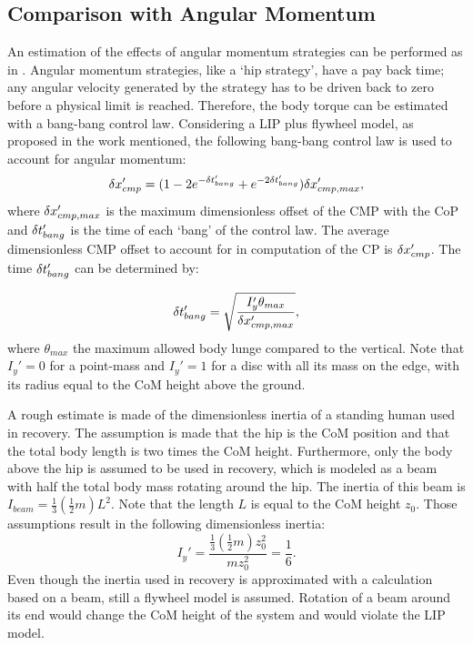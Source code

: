 \subsection{Comparison with Angular Momentum}
An estimation of the effects of angular momentum strategies can be performed as in \cite{koolen2012capturability}. Angular momentum strategies, like a `hip strategy', have a pay back time; any angular velocity generated by the strategy has to be driven back to zero before a physical limit is reached. Therefore, the body torque can be estimated with a bang-bang control law.  Considering a \ac{LIP} plus flywheel model, as proposed in the work mentioned, the following bang-bang control law is used to account for angular momentum:
\begin{equation}
\delta x_{cmp}' = (1-2e^{-\delta t_{bang}'}+e^{-2\delta t_{bang}'})\delta x_{cmp,max}',
\end{equation}
where $\delta x_{cmp,max}'$ is the maximum dimensionless offset of the \ac{CMP} with the \ac{CoP} and $\delta t_{bang}'$ is the time of each `bang' of the control law. The average dimensionless \ac{CMP} offset to account for in computation of the \ac{CP} is $\delta x_{cmp}'$. The time $\delta t_{bang}'$ can be determined by:

\begin{equation}
\delta t_{bang}' = \sqrt{\frac{I_y'\theta_{max}}{\delta x_{cmp,max}'}},
\end{equation}
where $\theta_{max}$ the maximum allowed body lunge compared to the vertical. Note that $I_y'=0$ for a point-mass and $I_y'=1$ for a disc with all its mass on the edge, with its radius equal to the \ac{CoM} height above the ground. 

A rough estimate is made of the dimensionless inertia of a standing human used in recovery. The assumption is made that the hip is the \ac{CoM} position \cite{gard2004comparison} and that the total body length is two times the \ac{CoM} height. Furthermore, only the body above the hip is assumed to be used in recovery, which is modeled as a beam with half the total body mass rotating around the hip. The inertia of this beam is $I_{beam} = \frac{1}{3}(\frac{1}{2}m)L^2$. Note that the length $L$ is equal to the \ac{CoM} height $z_0$. Those assumptions result in the following dimensionless inertia:
\begin{equation}
	I_y' = \frac{\frac{1}{3}(\frac{1}{2}m)z_0^2}{mz_0^2} = \frac{1}{6}.
\end{equation}
Even though the inertia used in recovery is approximated with a calculation based on a beam, still a flywheel model is assumed. Rotation of a beam around its end would change the \ac{CoM} height of the system and would violate the \ac{LIP} model.

